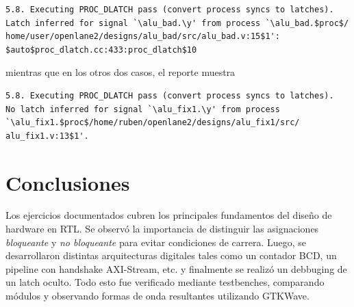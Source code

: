 \documentclass[12pt,a4paper]{article}
\begin{document}
\begin{verbatim}
5.8. Executing PROC_DLATCH pass (convert process syncs to latches).                                                               
Latch inferred for signal `\alu_bad.\y' from process `\alu_bad.$proc$/
home/user/openlane2/designs/alu_bad/src/alu_bad.v:15$1':   
$auto$proc_dlatch.cc:433:proc_dlatch$10   
\end{verbatim}

\noindent
mientras que en los otros dos casos, el reporte muestra

\begin{verbatim}
5.8. Executing PROC_DLATCH pass (convert process syncs to latches).                                                               
No latch inferred for signal `\alu_fix1.\y' from process                                                                          
`\alu_fix1.$proc$/home/ruben/openlane2/designs/alu_fix1/src/
alu_fix1.v:13$1'.  
\end{verbatim}

\section{Conclusiones}                                              \label{sec_3}

Los ejercicios documentados cubren los principales fundamentos del diseño de hardware en RTL. Se observó la importancia de distinguir las asignaciones \emph{bloqueante} y \emph{no bloqueante} para evitar condiciones de carrera. Luego, se desarrollaron distintas arquitecturas digitales tales como un contador BCD, un pipeline con handshake AXI-Stream, etc. y finalmente se realizó un debbuging de un latch oculto. Todo esto fue verificado mediante testbenches, comparando módulos y observando formas de onda resultantes utilizando GTKWave.

\newpage
\nocite{*}
\printbibliography[heading=bibintoc, title={4. \ Referencias}]
\end{document}
